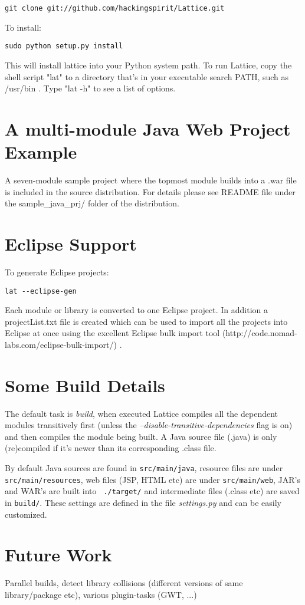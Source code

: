 \documentclass[12pt]{article}
\begin{document}
\begin{verbatim}
git clone git://github.com/hackingspirit/Lattice.git
\end{verbatim}


To install:
\begin{verbatim}
sudo python setup.py install
\end{verbatim}
This will install lattice into your Python system path. 
To run Lattice, copy the shell script "lat"  to a directory that's in your executable search PATH, such as /usr/bin .   Type "lat -h" to see a list of options.

\section{A multi-module Java Web Project Example}
A seven-module sample project where the topmost module builds into a .war
file is included in the source distribution. For details 
please see README file under the sample\_java\_prj/ folder of the distribution.

\section{Eclipse Support}
To generate Eclipse projects:
\begin{verbatim}
lat --eclipse-gen 
\end{verbatim}

Each module or library is converted to one Eclipse project.  In
addition a projectList.txt file is created which can be used to import
all the projects into Eclipse at once using the
excellent Eclipse bulk import tool
(http://code.nomad-labs.com/eclipse-bulk-import/) .


\section{Some Build Details}
The default task is {\it build}, when executed Lattice compiles all the dependent
modules transitively first (unless the {\it
  --disable-transitive-dependencies} flag is on) and then compiles the
module being built. A Java source file (.java) is only (re)compiled if
it's newer than its corresponding .class file.  

By default Java sources are found in {\tt src/main/java}, resource
files are under {\tt src/main/resources}, web files (JSP, HTML etc)
are under {\tt src/main/web}, JAR's and WAR's are built into {\tt
  ./target/} and intermediate files (.class etc) are saved in {\tt build/}.  
These settings are defined in the file {\it settings.py} and can be easily customized.



\section{Future Work}

Parallel builds, detect library collisions (different versions of same
library/package etc), various plugin-tasks (GWT, ...)
\end{document}
